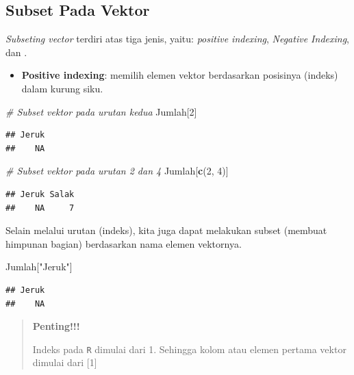 \documentclass[]{book}
\newenvironment{Shaded}{\begin{snugshade}}{\end{snugshade}}
\newcommand{\CommentTok}[1]{\textcolor[rgb]{0.56,0.35,0.01}{\textit{#1}}}
\newcommand{\DecValTok}[1]{\textcolor[rgb]{0.00,0.00,0.81}{#1}}
\newcommand{\KeywordTok}[1]{\textcolor[rgb]{0.13,0.29,0.53}{\textbf{#1}}}
\newcommand{\NormalTok}[1]{#1}
\newcommand{\StringTok}[1]{\textcolor[rgb]{0.31,0.60,0.02}{#1}}
\providecommand{\tightlist}{%
  \setlength{\itemsep}{0pt}\setlength{\parskip}{0pt}}
\theoremstyle{definition}
\theoremstyle{definition}
\theoremstyle{definition}
\theoremstyle{remark}
\begin{document}
\hypertarget{subsetvector}{%
\subsection{Subset Pada Vektor}\label{subsetvector}}

\emph{Subseting vector} terdiri atas tiga jenis, yaitu: \emph{positive indexing}, \emph{Negative Indexing}, dan .

\begin{itemize}
\tightlist
\item
  \textbf{Positive indexing}: memilih elemen vektor berdasarkan posisinya (indeks) dalam kurung siku.
\end{itemize}

\begin{Shaded}
\begin{Highlighting}[]
\CommentTok{# Subset vektor pada urutan kedua}
\NormalTok{Jumlah[}\DecValTok{2}\NormalTok{]}
\end{Highlighting}
\end{Shaded}

\begin{verbatim}
## Jeruk 
##    NA
\end{verbatim}

\begin{Shaded}
\begin{Highlighting}[]
\CommentTok{# Subset vektor pada urutan 2 dan 4}
\NormalTok{Jumlah[}\KeywordTok{c}\NormalTok{(}\DecValTok{2}\NormalTok{, }\DecValTok{4}\NormalTok{)]}
\end{Highlighting}
\end{Shaded}

\begin{verbatim}
## Jeruk Salak 
##    NA     7
\end{verbatim}

Selain melalui urutan (indeks), kita juga dapat melakukan subset (membuat himpunan bagian) berdasarkan nama elemen vektornya.

\begin{Shaded}
\begin{Highlighting}[]
\NormalTok{Jumlah[}\StringTok{"Jeruk"}\NormalTok{]}
\end{Highlighting}
\end{Shaded}

\begin{verbatim}
## Jeruk 
##    NA
\end{verbatim}

\begin{quote}
\textbf{Penting!!!}

Indeks pada \texttt{R} dimulai dari 1. Sehingga kolom atau elemen pertama vektor dimulai dari {[}1{]}
\end{quote}
\end{document}
